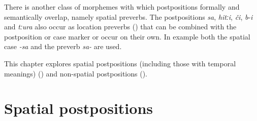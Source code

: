 There is another class of morphemes with which postpositions formally and semantically overlap, namely spatial preverbs. The postpositions \textit{sa}, \textit{hitːi}, \textit{či}, \textit{b}-\textit{i} and \textit{tːura} also occur as location preverbs () that can be combined with the postposition or case marker or occur on their own. In example  both the spatial case \textit{-sa} and the preverb \textit{sa-} are used.

This chapter explores spatial postpositions (including those with temporal meanings) () and non-spatial postpositions (). 


\section{Spatial postpositions}
\label{sec:Spatialpostpositions}

